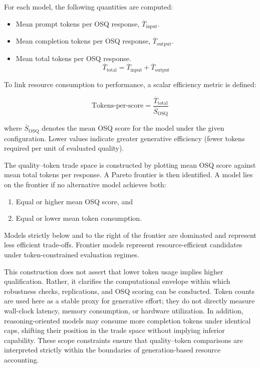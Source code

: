 For each model, the following quantities are computed:

\begin{itemize}[nosep]
    \item Mean prompt tokens per OSQ response, $\overline{T}_{\text{input}}$.
    \item Mean completion tokens per OSQ response, $\overline{T}_{\text{output}}$.
    \item Mean total tokens per OSQ response.
    \[
        \overline{T}_{\text{total}} = \overline{T}_{\text{input}} + \overline{T}_{\text{output}}
    \]

\end{itemize}

To link resource consumption to performance, a scalar efficiency metric is defined:

\[
\text{Tokens-per-score} =
\frac{\overline{T}_{\text{total}}}{\overline{S}_{\text{OSQ}}}
\]

where $\overline{S}_{\text{OSQ}}$ denotes the mean OSQ score for the model under the given configuration. Lower values indicate greater generative efficiency (fewer tokens required per unit of evaluated quality).

The quality--token trade space is constructed by plotting mean OSQ score against mean total tokens per response. A Pareto frontier is then identified. A model lies on the frontier if no alternative model achieves both:

\begin{enumerate}[nosep]
    \item Equal or higher mean OSQ score, and
    \item Equal or lower mean token consumption.
\end{enumerate}

Models strictly below and to the right of the frontier are dominated and represent less efficient trade-offs. Frontier models represent resource-efficient candidates under token-constrained evaluation regimes.

This construction does not assert that lower token usage implies higher qualification. Rather, it clarifies the computational envelope within which robustness checks, replications, and OSQ scoring can be conducted. Token counts are used here as a stable proxy for generative effort; they do not directly measure wall-clock latency, memory consumption, or hardware utilization. In addition, reasoning-oriented models may consume more completion tokens under identical caps, shifting their position in the trade space without implying inferior capability. These scope constraints ensure that quality--token comparisons are interpreted strictly within the boundaries of generation-based resource accounting.


